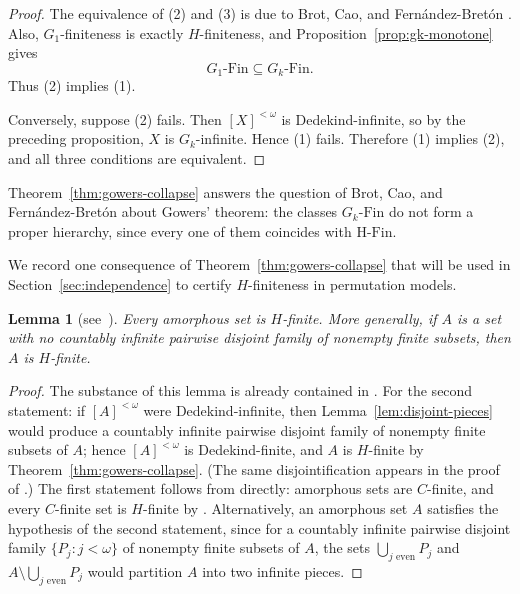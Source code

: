 \documentclass[10pt,a4paper]{amsart}
\newtheorem{lemma}[theorem]{Lemma}
\theoremstyle{definition}
\newcommand{\Fin}{\mathrm{Fin}}
\newcommand{\HFin}{\mathrm{H\text{-}Fin}}
\begin{document}
\begin{proof}
The equivalence of (2) and (3) is due to Brot, Cao, and Fern\'andez-Bret\'on \cite[Theorem~3.2]{BCF}.  Also, \(G_1\)-finiteness is exactly \(H\)-finiteness, and Proposition~\ref{prop:gk-monotone} gives
\[
    G_1\text{-}\Fin\subseteq G_k\text{-}\Fin.
\]
Thus (2) implies (1).

Conversely, suppose (2) fails.  Then \([X]^{<\omega}\) is Dedekind-infinite, so by the preceding proposition, \(X\) is \(G_k\)-infinite.  Hence (1) fails.  Therefore (1) implies (2), and all three conditions are equivalent.
\end{proof}

Theorem~\ref{thm:gowers-collapse} answers the question of Brot, Cao, and Fern\'andez-Bret\'on about Gowers' theorem: the classes \(G_k\text{-}\Fin\) do not form a proper hierarchy, since every one of them coincides with \(\HFin\).

We record one consequence of Theorem~\ref{thm:gowers-collapse} that will be used in Section~\ref{sec:independence} to certify \(H\)-finiteness in permutation models.

\begin{lemma}[{see\ \cite[Theorems~3.2 and~3.7]{BCF}}]\label{lem:amorphous-hfin}
Every amorphous set is \(H\)-finite.  More generally, if \(A\) is a set with no countably infinite pairwise disjoint family of nonempty finite subsets, then \(A\) is \(H\)-finite.
\end{lemma}

\begin{proof}
The substance of this lemma is already contained in \cite{BCF}.  For the second statement: if \([A]^{<\omega}\) were Dedekind-infinite, then Lemma~\ref{lem:disjoint-pieces} would produce a countably infinite pairwise disjoint family of nonempty finite subsets of \(A\); hence \([A]^{<\omega}\) is Dedekind-finite, and \(A\) is \(H\)-finite by Theorem~\ref{thm:gowers-collapse}.  (The same disjointification appears in the proof of \cite[Theorem~3.2]{BCF}.)  The first statement follows from \cite{BCF} directly: amorphous sets are \(C\)-finite, and every \(C\)-finite set is \(H\)-finite by \cite[Theorem~3.7]{BCF}.  Alternatively, an amorphous set \(A\) satisfies the hypothesis of the second statement, since for a countably infinite pairwise disjoint family \(\{P_j:j<\omega\}\) of nonempty finite subsets of \(A\), the sets \(\bigcup_{j\text{ even}}P_j\) and \(A\setminus\bigcup_{j\text{ even}}P_j\) would partition \(A\) into two infinite pieces.
\end{proof}
\end{document}
